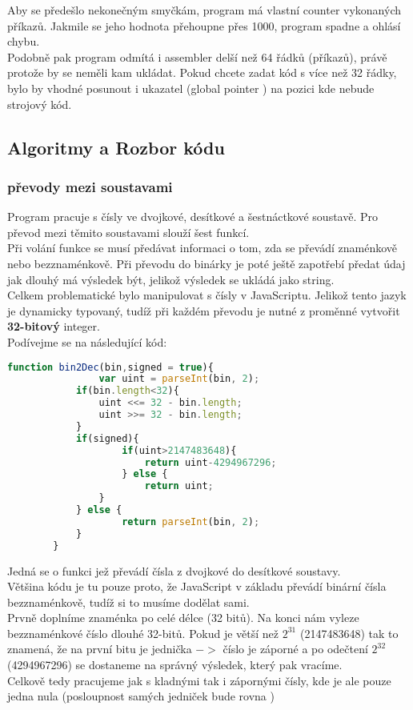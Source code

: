 \documentclass[a4paper,titlepage]{article}
\begin{document}
	Aby se předešlo nekonečným smyčkám, program má vlastní counter vykonaných příkazů.
	Jakmile se jeho hodnota přehoupne přes 1000, program spadne a ohlásí chybu. \\
	Podobně pak program odmítá i assembler delší než 64 řádků (příkazů), právě protože by se neměli kam ukládat.
	Pokud chcete zadat kód s více než 32 řádky, bylo by vhodné posunout i ukazatel (global pointer ) na pozici kde nebude strojový kód.
	

\subsection{Algoritmy a Rozbor kódu}
	\subsubsection{převody mezi soustavami}
		Program pracuje s čísly ve dvojkové, desítkové a šestnáctkové soustavě. Pro převod mezi těmito soustavami slouží šest funkcí.\\

		Při volání funkce se musí předávat informaci o tom, zda se převádí znaménkově nebo bezznaménkově.
		Při převodu do binárky je poté ještě zapotřebí předat údaj jak dlouhý má výsledek být, jelikož výsledek se ukládá jako string.\\
		
		Celkem problematické bylo manipulovat s čísly v JavaScriptu.
		Jelikož tento jazyk je dynamicky typovaný, tudíž při každém převodu je nutné z proměnné vytvořit \textbf{32-bitový} integer.\\

		Podívejme se na následující kód:
		\begin{lstlisting}[language=JavaScript]
		function bin2Dec(bin,signed = true){
				var uint = parseInt(bin, 2);
		    if(bin.length<32){
		        uint <<= 32 - bin.length;
		        uint >>= 32 - bin.length;
		    }
		    if(signed){
		    		if(uint>2147483648){
		        		return uint-4294967296;
		    		} else {
		        		return uint;
		        }
		    } else {    
		    		return parseInt(bin, 2);
		    }
		}
		\end{lstlisting}
		Jedná se o funkci jež převádí čísla z dvojkové do desítkové soustavy.\\
		Většina kódu je tu pouze proto, že JavaScript v základu převádí binární čísla bezznaménkově, tudíž si to musíme dodělat sami.\\
		Prvně doplníme znaménka po celé délce (32 bitů).
		Na konci nám vyleze bezznaménkové číslo dlouhé 32-bitů.
		Pokud je větší než $2^{31}$ (2147483648) tak to znamená, že na první bitu je jednička $->$ číslo je záporné a
		po odečtení $2^{32}$ (4294967296) se dostaneme na správný výsledek, který pak vracíme.\\
		Celkově tedy pracujeme jak s kladnými tak i zápornými čísly, kde je ale pouze jedna nula (posloupnost samých jedniček bude rovna )
		
\end{document}

